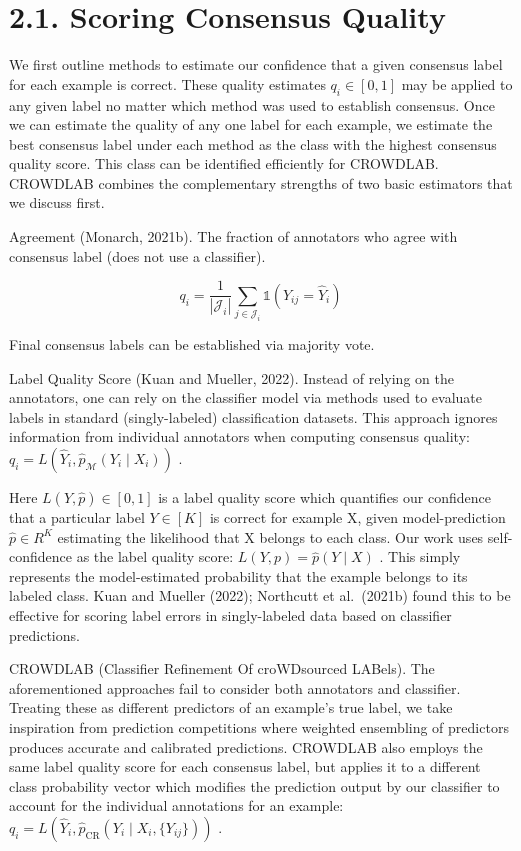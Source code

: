 \documentclass[
]{article}
\begin{document}
\section{2.1. Scoring Consensus
Quality}\label{scoring-consensus-quality}

We first outline methods to estimate our confidence that a given
consensus label for each example is correct. These quality estimates
\(q_{i} \in [0, 1]\) may be applied to any given label no matter which
method was used to establish consensus. Once we can estimate the quality
of any one label for each example, we estimate the best consensus label
under each method as the class with the highest consensus quality score.
This class can be identified efficiently for CROWDLAB. CROWDLAB combines
the complementary strengths of two basic estimators that we discuss
first.

Agreement (Monarch, 2021b). The fraction of annotators who agree with
consensus label (does not use a classifier).

\[
q _ {i} = \frac {1}{| \mathcal {J} _ {i} |} \sum_ {j \in \mathcal {J} _ {i}} \mathbb {1} \left(Y _ {i j} = \widehat {Y} _ {i}\right) \tag {1}
\]

Final consensus labels can be established via majority vote.

Label Quality Score (Kuan and Mueller, 2022). Instead of relying on the
annotators, one can rely on the classifier model via methods used to
evaluate labels in standard (singly-labeled) classification datasets.
This approach ignores information from individual annotators when
computing consensus quality:
\(q_{i} = L(\widehat{Y}_{i}, \widehat{p}_{\mathcal{M}}(Y_{i} \mid X_{i}))\)
.

Here \(L(Y, \hat{p}) \in [0, 1]\) is a label quality score which
quantifies our confidence that a particular label \(Y \in [K]\) is
correct for example X, given model-prediction \(\hat{p} \in R^{K}\)
estimating the likelihood that X belongs to each class. Our work uses
self-confidence as the label quality score:
\(L(Y, p) = \hat{p}(Y \mid X)\) . This simply represents the
model-estimated probability that the example belongs to its labeled
class. Kuan and Mueller (2022); Northcutt et al.~(2021b) found this to
be effective for scoring label errors in singly-labeled data based on
classifier predictions.

CROWDLAB (Classifier Refinement Of croWDsourced LABels). The
aforementioned approaches fail to consider both annotators and
classifier. Treating these as different predictors of an example's true
label, we take inspiration from prediction competitions where weighted
ensembling of predictors produces accurate and calibrated predictions.
CROWDLAB also employs the same label quality score for each consensus
label, but applies it to a different class probability vector which
modifies the prediction output by our classifier to account for the
individual annotations for an example:
\(q_i = L(\hat{Y}_i, \hat{p}_{\text{CR}}(Y_i \mid X_i, \{Y_{ij}\}))\) .
\end{document}
